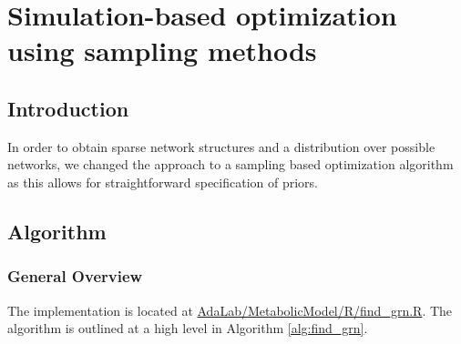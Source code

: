 \chapter{Simulation-based optimization using sampling methods}
\section{Introduction}
In order to obtain sparse network structures and a distribution over possible networks, we changed the approach to a sampling based optimization algorithm as this allows for straightforward specification of priors.
\section{Algorithm}
\subsection{General Overview}
The implementation is located at \url{AdaLab/MetabolicModel/R/find_grn.R}. The algorithm is outlined at a high level
in Algorithm \ref{alg:find_grn}.
